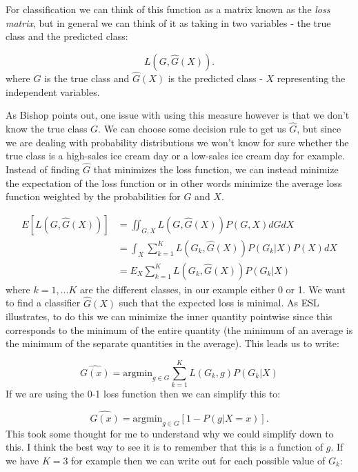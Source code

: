 For classification we can think of this function as a matrix known as the \emph{loss matrix}, but in general we can think of it as taking in two variables - the true class and the predicted class:

\begin{equation}
L(G, \hat{G}(X)).
\end{equation}
where $G$ is the true class and $\hat{G}(X)$ is the predicted class - $X$ representing the independent variables.

As Bishop points out, one issue with using this measure however is that we don't know the true class $G$. We can choose some decision rule to get us $\hat{G}$, but since we are dealing with probability distributions we won't know for sure whether the true class is a high-sales ice cream day or a low-sales ice cream day for example. Instead of finding $\hat{G}$ that minimizes the loss function, we can instead minimize the expectation of the loss function or in other words minimize the average loss function weighted by the probabilities for $G$ and $X$.

\begin{equation}
\begin{split}
E[L(G, \hat{G}(X))] & = \iint_{G, X} {L(G, \hat{G}(X)) P(G, X) dG dX} \\
& = \int_{X} \sum_{k=1}^{K} {L(G_k, \hat{G}(X)) P(G_k|X) P(X) dX} \\
&= E_{X} \sum_{k=1}^{K} {L(G_k, \hat{G}(X)) P(G_k|X)}
\end{split}
\end{equation}
where $k=1,...K$ are the different classes, in our example either 0 or 1. We want to find a classifier $\hat{G}(X)$ such that the expected loss is minimal. As ESL illustrates, to do this we can minimize the inner quantity pointwise since this corresponds to the minimum of the entire quantity (the minimum of an average is the minimum of the separate quantities in the average). This leads us to write:

\begin{equation}
\hat{G(x)} = \text{argmin}_{g \in G} \sum_{k=1}^{K} {L(G_k, g) P(G_k|X)}
\end{equation}
If we are using the 0-1 loss function then we can simplify this to:

\begin{equation}
\hat{G(x)} = \text{argmin}_{g \in G} \left[1 - P(g|X=x) \right].
\end{equation}
This took some thought for me to understand why we could simplify down to this. I think the best way to see it is to remember that this is a function of $g$. If we have $K=3$ for example then we can write out for each possible value of $G_k$:

